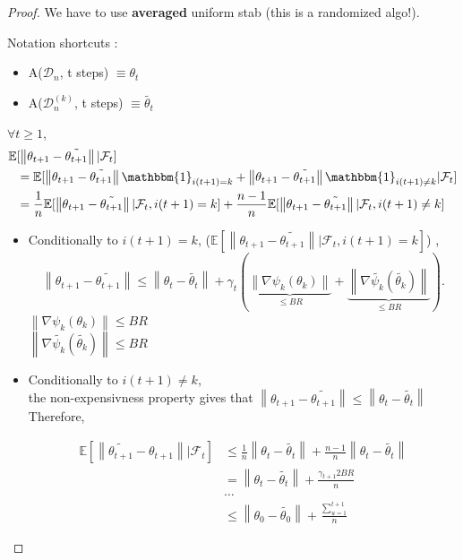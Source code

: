 \begin{proof}
    We have to use \textbf{averaged} uniform stab (this is a randomized algo!).
    
    Notation shortcuts : \begin{itemize}
        \item A($\mathcal{D}_n$, t steps) $\equiv \theta_t$
        \item A($\mathcal{D}_n^{(k)}$, t steps) $\equiv \tilde{\theta_t}$
    \end{itemize}

    
    $\forall t \geq 1$,
    \begin{align*}
        \mathbb{E} 
            & [ \left\| \theta_{t+1} - \tilde{\theta_{t+1}} \right\| | \mathcal{F}_t ] \\
            & = \mathbb{E}[ \left\| \theta_{t+1} - \tilde{\theta_{t+1}} \right\| \mathbbm{1}_{i(t+1)= k} + \left\| \theta_{t+1} - \tilde{\theta_{t+1}} \right\| \mathbbm{1}_{i(t+1)\neq  k}| \mathcal{F}_t] \\
            & = \frac{1}{n} \mathbb{E}[ \left\| \theta_{t+1} - \tilde{\theta_{t+1}} \right\| | \mathcal{F}_t, i(t+1)= k] + \frac{n-1}{n} \mathbb{E}[ \left\| \theta_{t+1} - \tilde{\theta_{t+1}} \right\| | \mathcal{F}_t, i(t+1) \neq k]
    \end{align*}
    
    \begin{itemize}
        \item Conditionally to $i(t+1) = k$,  ($\mathbb{E}[ \left\| \theta_{t+1} - \tilde{\theta_{t+1}} \right\| | \mathcal{F}_t, i(t+1)= k]$) , 
        \[
            \left\| \theta_{t+1} - \tilde{\theta_{t+1}} \right\| \leq \left\| \theta_{t} - \tilde{\theta_{t}} \right\| + \gamma _t ( \underbrace{\left\| \nabla \psi_k (\theta _k) \right\|}_{\leq BR}  + \underbrace{\left\| \nabla \tilde{\psi_k} (\tilde{\theta _k}) \right\|}_{\leq BR})
        .\]
        $\left\| \nabla \psi_k (\theta _k) \right\| \leq BR$ \\
        $\left\| \nabla \tilde{\psi_k} (\tilde{\theta _k}) \right\| \leq BR$

        \item Conditionally to $i(t+1) \neq  k$, \\
        the non-expensivness property gives that $\left\|  \theta_{t+1} - \tilde{\theta_{t+1}} \right\| \leq \left\|  \theta_{t} - \tilde{\theta_{t}} \right\|$ \\
        Therefore,
        
        \begin{align*}
            \mathbb{E}[ \left\| \tilde{\theta_{t+1}} - \theta_{t+1} \right\| | \mathcal{F}_t] &\leq \frac{1}{n} \left\| \theta_{t} - \tilde{\theta_{t}} \right\| + \frac{n-1}{n} \left\| \theta_{t} - \tilde{\theta_{t}} \right\| \\
            & = \left\| \theta_{t} - \tilde{\theta_{t}} \right\| + \frac{\gamma _ {t+1} 2BR}{n} \\
            & \dots \\
            & \leq \left\| \theta_0 - \tilde{\theta _0} \right\|  + \frac{\sum_{u=1}^{t+1}}{n}
        \end{align*}


\end{itemize}
\end{proof}
